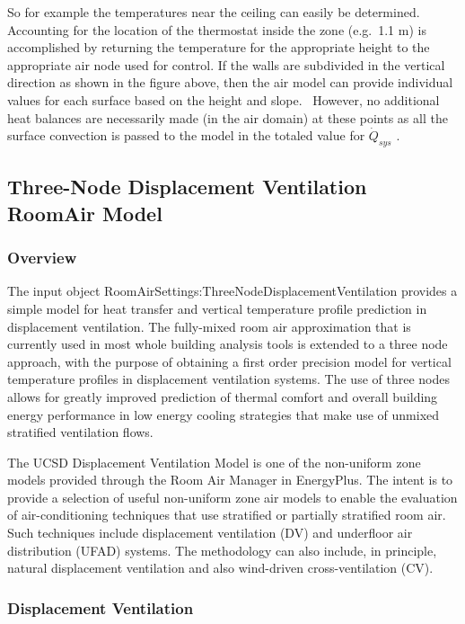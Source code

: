 So for example the temperatures near the ceiling can easily be determined. Accounting for the location of the thermostat inside the zone (e.g.~1.1 m) is accomplished by returning the temperature for the appropriate height to the appropriate air node used for control. If the walls are subdivided in the vertical direction as shown in the figure above, then the air model can provide individual values for each surface based on the height and slope.~ However, no additional heat balances are necessarily made (in the air domain) at these points as all the surface convection is passed to the model in the totaled value for \({\dot Q_{sys}}\) .

\subsection{Three-Node Displacement Ventilation RoomAir Model}\label{three-node-displacement-ventilation-roomair-model}

\subsubsection{Overview}\label{overview-005}

The input object RoomAirSettings:ThreeNodeDisplacementVentilation provides a simple model for heat transfer and vertical temperature profile prediction in displacement ventilation. The fully-mixed room air approximation that is currently used in most whole building analysis tools is extended to a three node approach, with the purpose of obtaining a first order precision model for vertical temperature profiles in displacement ventilation systems. The use of three nodes allows for greatly improved prediction of thermal comfort and overall building energy performance in low energy cooling strategies that make use of unmixed stratified ventilation flows.

The UCSD Displacement Ventilation Model is one of the non-uniform zone models provided through the Room Air Manager in EnergyPlus. The intent is to provide a selection of useful non-uniform zone air models to enable the evaluation of air-conditioning techniques that use stratified or partially stratified room air. Such techniques include displacement ventilation (DV) and underfloor air distribution (UFAD) systems. The methodology can also include, in principle, natural displacement ventilation and also wind-driven cross-ventilation (CV).

\subsubsection{Displacement Ventilation}\label{displacement-ventilation}

